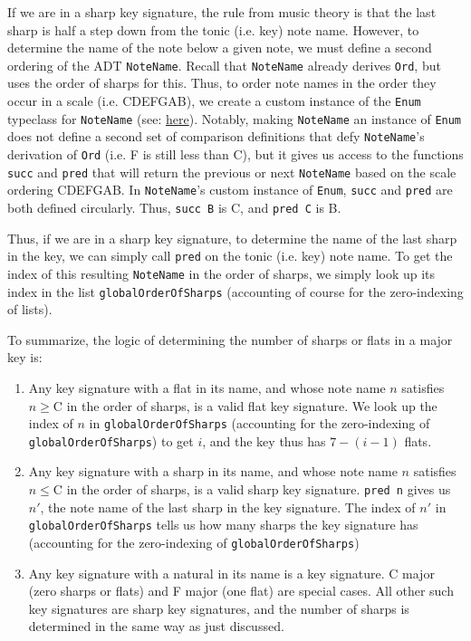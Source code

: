 \documentclass{report}
\begin{document}
If we are in a sharp key signature, the rule from music theory is that the last sharp is half a step down from the tonic (i.e. key) note name. However, to determine the name of the note below a given note, we must define a second ordering of the ADT \verb.NoteName.. Recall that \verb.NoteName. already derives \verb.Ord., but uses the order of sharps for this. Thus, to order note names in the order they occur in a scale (i.e. CDEFGAB), we create a custom instance of the \verb.Enum. typeclass for \verb.NoteName. (see: \href{https://github.com/ilanashapiro/MusAssist/blob/main/app/MusAssistAST.hs#L21}{here}). Notably, making \verb.NoteName. an instance of \verb.Enum. does not define a second set of comparison definitions that defy \verb.NoteName.'s derivation of \verb.Ord. (i.e. F is still less than C), but it gives us access to the functions \verb.succ. and \verb.pred. that will return the previous or next \verb.NoteName. based on the scale ordering CDEFGAB. In \verb.NoteName.'s custom instance of \verb.Enum., \verb.succ. and \verb.pred. are both defined circularly. Thus, \verb.succ B. is C, and \verb.pred C. is B.

Thus, if we are in a sharp key signature, to determine the name of the last sharp in the key, we can simply call \verb.pred. on the tonic (i.e. key) note name. To get the index of this resulting \verb.NoteName. in the order of sharps, we simply look up its index in the list \verb.globalOrderOfSharps. (accounting of course for the zero-indexing of lists).

To summarize, the logic of determining the number of sharps or flats in a major key is:
\begin{enumerate}
\item Any key  signature with a flat in its name, and whose note name $n$ satisfies $n \geq $\;C in the order of sharps, is a valid flat key signature. We look up the index of $n$ in \verb.globalOrderOfSharps. (accounting for the zero-indexing of \verb.globalOrderOfSharps.) to get $i$, and the key thus has $7-(i-1)$ flats.
\item Any key  signature with a sharp in its name, and whose note name $n$ satisfies $n \leq $\;C in the order of sharps, is a valid sharp key signature. \verb.pred n. gives us $n'$, the note name of the last sharp in the key signature. The index of $n'$ in \verb.globalOrderOfSharps. tells us how many sharps the key signature has (accounting for the zero-indexing of \verb.globalOrderOfSharps.)

\item Any key  signature with a natural in its name is a key signature. C major (zero sharps or flats) and F major (one flat) are special cases. All other such key signatures are sharp key signatures, and the number of sharps is determined in the same way as just discussed.
\end{enumerate}
\end{document}
